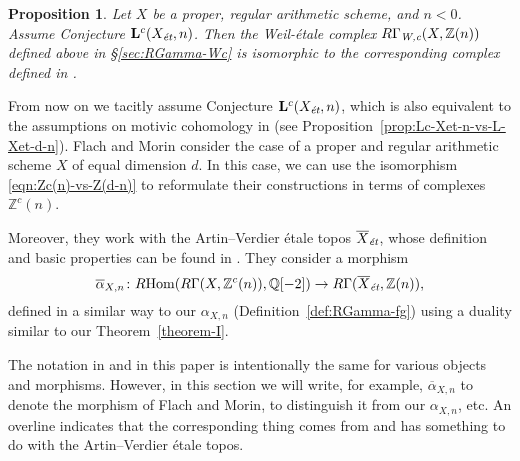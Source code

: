 \documentclass[leqno,12pt]{article}
\theoremstyle{plain}
\newtheorem{proposition}[theorem]{\indent\sc Proposition}
\theoremstyle{definition}
\DeclareMathOperator{\Hom}{Hom}
\newcommand{\QQ}{\mathbb{Q}}
\newcommand{\ZZ}{\mathbb{Z}}
\newcommand{\Wc}{\text{\it W,c}}
\newcommand{\et}{\text{\it \'{e}t}}
\newcommand{\RHom}{R\!\Hom}
\begin{document}
\begin{proposition}
  \label{prop:comparison-with-FM}
  Let $X$ be a proper, regular arithmetic scheme, and $n < 0$. Assume
  Conjecture $\mathbf{L}^c (X_\et, n)$. Then the Weil-\'{e}tale complex
  $R\Gamma_\Wc (X, \ZZ(n))$ defined above in {\rm \S\ref{sec:RGamma-Wc}}
  is isomorphic to the corresponding complex defined in
  {\rm \cite{Flach-Morin-2018}}.
\end{proposition}

From now on we tacitly assume Conjecture $\mathbf{L}^c (X_\et, n)$, which is
also equivalent to the assumptions on motivic cohomology in
\cite{Flach-Morin-2018} (see
Proposition~\ref{prop:Lc-Xet-n-vs-L-Xet-d-n}). Flach and Morin consider the case
of a proper and regular arithmetic scheme $X$ of equal dimension $d$. In this
case, we can use the isomorphism \eqref{eqn:Zc(n)-vs-Z(d-n)} to reformulate
their constructions in terms of complexes $\ZZ^c (n)$.

Moreover, they work with the Artin--Verdier \'{e}tale topos $\overline{X}_\et$,
whose definition and basic properties can be found in
\cite[\S 6]{Flach-Morin-2018}. They consider a morphism
\[ \overline{\alpha}_{X,n}\colon
  \RHom (R\Gamma (X, \ZZ^c (n)), \QQ [-2]) \to
  R\Gamma (\overline{X}_\et, \ZZ (n)), \]
defined in a similar way to our $\alpha_{X,n}$ (Definition~\ref{def:RGamma-fg})
using a duality similar to our Theorem~\ref{theorem-I}.

The notation in \cite{Flach-Morin-2018} and in this paper is intentionally the
same for various objects and morphisms. However, in this section we will write,
for example, $\overline{\alpha}_{X,n}$ to denote the morphism of Flach and
Morin, to distinguish it from our $\alpha_{X,n}$, etc. An overline indicates
that the corresponding thing comes from \cite{Flach-Morin-2018} and has
something to do with the Artin--Verdier \'{e}tale topos.
\end{document}
